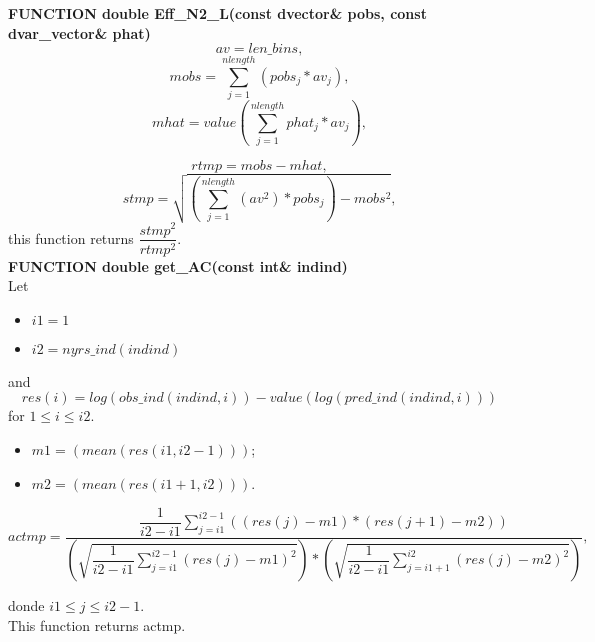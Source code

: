 \documentclass{article}
\begin{document}
\textbf{FUNCTION double Eff\_N2\_L(const dvector\& pobs, const dvar\_vector\& phat)}\\
\begin{equation}
    av = len\_bins, 
\end{equation}
\begin{equation}
    mobs =   \sum_{j=1}^{nlength}(pobs_j*av_j),
\end{equation}
\begin{equation}
    mhat = value\left(\sum_{j=1}^{nlength}phat_j*av_j\right),
\end{equation}

\begin{equation}
    rtmp = mobs-mhat,
\end{equation}
\begin{equation}
    stmp = \sqrt{\left(\sum_{j=1}^{nlength}(av^2)*pobs_j\right) - mobs^2},
\end{equation}
this function returns $\dfrac{stmp^2}{rtmp^2}$.\\

\textbf{FUNCTION double get\_AC(const int\& indind)}\\
Let 
\begin{itemize}
    \item $i1=1$
    \item $i2 = nyrs\_ind(indind)$
\end{itemize}
and
\begin{equation}
    res(i) = log(obs\_ind(indind,i)) - value(log(pred\_ind(indind,i)))
\end{equation}
for $1\leq i \leq i2$.\\

\begin{itemize}
    \item $m1 = (mean(res(i1,i2-1)))$;
    \item $m2 = (mean(res(i1+1,i2))).$
\end{itemize}

\begin{equation}
    actmp = \dfrac{\dfrac{1}{i2-i1}\displaystyle\sum_{j=i1}^{i2-1}\left((res(j) - m1)*(res(j+1) - m2)\right)}{\left(\sqrt{\dfrac{1}{i2-i1}\displaystyle\sum_{j=i1}^{i2-1}(res(j) - m1 )^2} \right) * \left(\sqrt{\dfrac{1}{i2-i1}\displaystyle\sum_{j=i1+1}^{i2}(res(j) - m2 )^2} \right)},
\end{equation}

donde $i1\leq j \leq i2-1$.\\
This function returns actmp.\\
\end{document}
